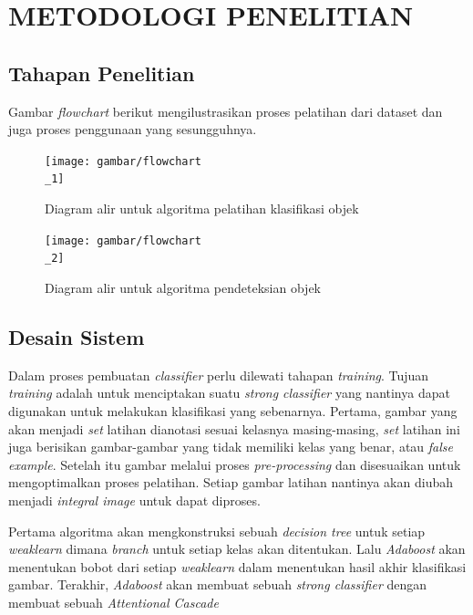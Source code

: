 
\chapter{METODOLOGI PENELITIAN}

\section{Tahapan Penelitian}

Gambar \textit{flowchart} berikut mengilustrasikan proses pelatihan 
 dari dataset dan juga proses penggunaan yang sesungguhnya.

\begin{figure}[H]
  \centering{}
	\texttt{[image: gambar/flowchart\\\_1]}
  \caption{Diagram alir untuk algoritma pelatihan klasifikasi objek}
\end{figure}

\begin{figure}[H]
  \centering{}
	\texttt{[image: gambar/flowchart\\\_2]}
  \caption{Diagram alir untuk algoritma pendeteksian objek}
\end{figure}


\section{Desain Sistem}

Dalam proses pembuatan \emph{classifier} perlu dilewati tahapan \textit{training}. 
Tujuan \textit{training} adalah untuk menciptakan suatu \emph{strong classifier} 
yang nantinya dapat digunakan untuk melakukan klasifikasi yang sebenarnya.
Pertama, gambar yang akan menjadi \textit{set} latihan dianotasi sesuai kelasnya masing-masing, 
\textit{set} latihan ini juga berisikan gambar-gambar yang tidak memiliki kelas yang benar, atau 
\emph{false example}. Setelah itu gambar melalui proses \emph{pre-processing} dan disesuaikan 
untuk mengoptimalkan proses pelatihan. Setiap gambar latihan nantinya akan 
diubah menjadi \emph{integral image} untuk dapat diproses.

Pertama algoritma akan mengkonstruksi sebuah \emph{decision tree} untuk setiap 
\emph{weaklearn} dimana \emph{branch} untuk setiap kelas akan ditentukan. Lalu 
\emph{Adaboost} akan menentukan bobot dari setiap \emph{weaklearn} dalam menentukan hasil akhir 
klasifikasi gambar. Terakhir, \emph{Adaboost} akan membuat sebuah 
\emph{strong classifier} dengan membuat sebuah \emph{Attentional Cascade}

